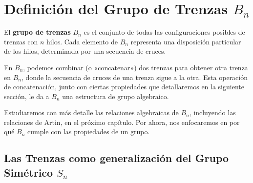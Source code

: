 


\section{Definición del Grupo de Trenzas \( B_n \)}

El \textbf{grupo de trenzas} \( B_n \) es el conjunto de todas las configuraciones posibles de trenzas con \( n \) hilos. Cada elemento de \( B_n \) representa una disposición particular de los hilos, determinada por una secuencia de cruces.

En \( B_n \), podemos combinar (o «concatenar») dos trenzas para obtener otra trenza en \( B_n \), donde la secuencia de cruces de una trenza sigue a la otra. Esta operación de concatenación, junto con ciertas propiedades que detallaremos en la siguiente sección, le da a \( B_n \) una estructura de grupo algebraico.

Estudiaremos con más detalle las relaciones algebraicas de \( B_n \), incluyendo las relaciones de Artin, en el próximo capítulo. Por ahora, nos enfocaremos en por qué \( B_n \) cumple con las propiedades de un grupo.

\subsection{Las Trenzas como generalización del Grupo Simétrico \( S_n \)}

